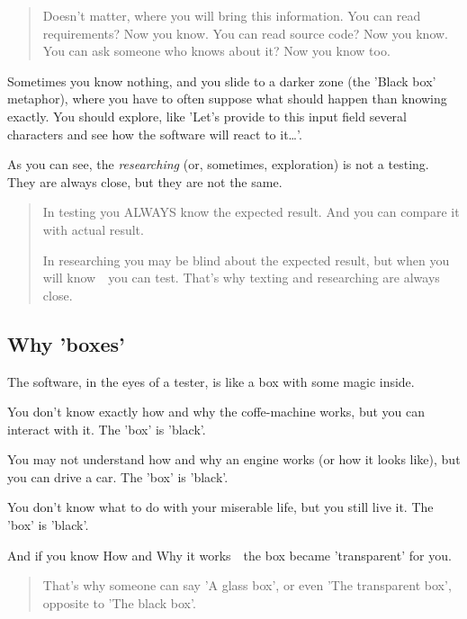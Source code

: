 \begin{quote}
Doesn't matter, where you will bring this information. You can read requirements? Now you know. You can read source code? Now you know. You can ask someone who knows about it? Now you know too. 
\end{quote} 

Sometimes you know nothing, and you slide to a darker zone (the 'Black box' metaphor), where you have to often suppose what should happen than knowing exactly. You should explore, like 'Let's provide to this input field several characters and see how the software will react to it\ldots'.

As you can see, the \emph{researching} (or, sometimes, exploration) is not a testing. They are always close, but they are not the same.

\begin{quote}
In testing you ALWAYS know the expected result. And you can compare it with actual result.

In researching you may be blind about the expected result, but when you will know~\textemdash~you can test. That's why texting and researching are always close.
\end{quote} 

\subsection{Why 'boxes'}

The software, in the eyes of a tester, is like a box with some magic inside.

You don't know exactly how and why the coffe-machine works, but you can interact with it. The 'box' is 'black'.

You may not understand how and why an engine works (or how it looks like), but you can drive a car. The 'box' is 'black'.

You don't know what to do with your miserable life, but you still live it. The 'box' is 'black'.

And if you know How and Why it works~\textemdash~the box became 'transparent' for you.

\begin{quote}
That's why someone can say 'A glass box', or even 'The transparent box', opposite to 'The black box'.                                                                                                                                                                                       \end{quote} 

